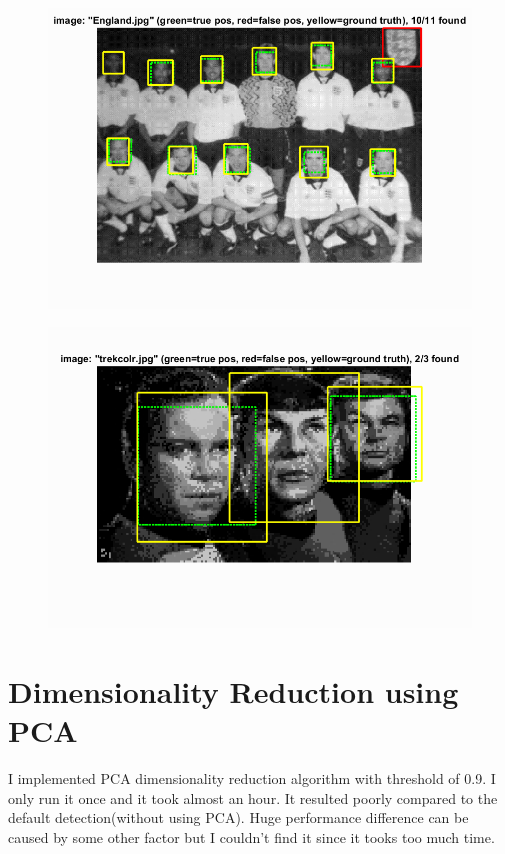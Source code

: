 \documentclass{article}
\begin{document}
\newpage
\begin{figure}[!htb]
 \centering
  \includegraphics[width=.92\textwidth]{sample4.png}
\end{figure}%
\begin{figure}[!htb]
 \centering
  \includegraphics[width=.92\textwidth]{sample5.png}
\end{figure}%

\newpage

\section{Dimensionality Reduction using PCA}
I implemented PCA dimensionality reduction algorithm with threshold of 0.9. I only run it once and it took almost an hour. It resulted poorly compared to the default detection(without using PCA). Huge performance difference can be caused by some other factor but I couldn't find it since it tooks too much time.
\end{document}

